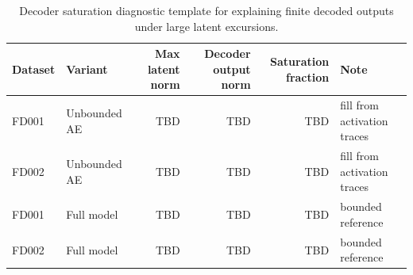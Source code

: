 \begin{table}[t]
\centering
\caption{Decoder saturation diagnostic template for explaining finite decoded outputs under large latent excursions.}
\label{tab:decoder_saturation}
\begin{tabular}{llrrrl}
\toprule
Dataset & Variant & Max latent norm & Decoder output norm & Saturation fraction & Note \\
\midrule
FD001 & Unbounded AE & TBD & TBD & TBD & fill from activation traces \\
FD002 & Unbounded AE & TBD & TBD & TBD & fill from activation traces \\
FD001 & Full model & TBD & TBD & TBD & bounded reference \\
FD002 & Full model & TBD & TBD & TBD & bounded reference \\
\bottomrule
\end{tabular}
\end{table}